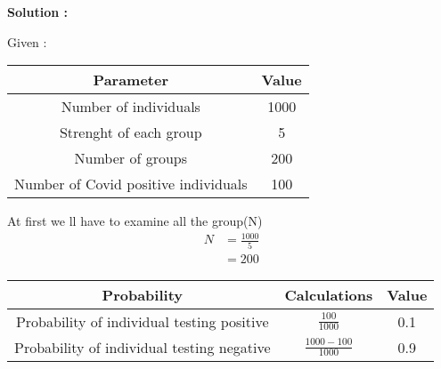 \documentclass[journal,12pt,onecolumn]{IEEEtran}
\begin{document}
\textbf{Solution :}


Given : 
\begin{table}[h]
\def\arraystretch{1.2}
\begin{tabular}{|c|c|}
\hline
	\textbf{Parameter} &\textbf{Value} \\ \hline
	Number of individuals &1000 \\ \hline
	Strenght of each group &5 \\ 
	\hline
	Number of groups &200 \\ 
	\hline
	Number of Covid positive individuals &100 \\ \hline
	
	
\end{tabular}
\end{table}
At first we ll have to examine all the group(N)
\begin{align}
N&=\frac{1000}{5} \\
&= 200
\end{align}
\begin{table}[h]
\def\arraystretch{1.2}
\begin{tabular}{|c|c|c|}
\hline
	\textbf{Probability} &\textbf{Calculations} &\textbf{Value}  \\ \hline
	Probability of individual testing positive &$\frac{100}{1000}$ &0.1 \\ \hline
	Probability of individual testing negative &$\frac{1000-100}{1000}$  &0.9 \\ 
	\hline
	
	
\end{tabular}
\end{table}
\end{document}
